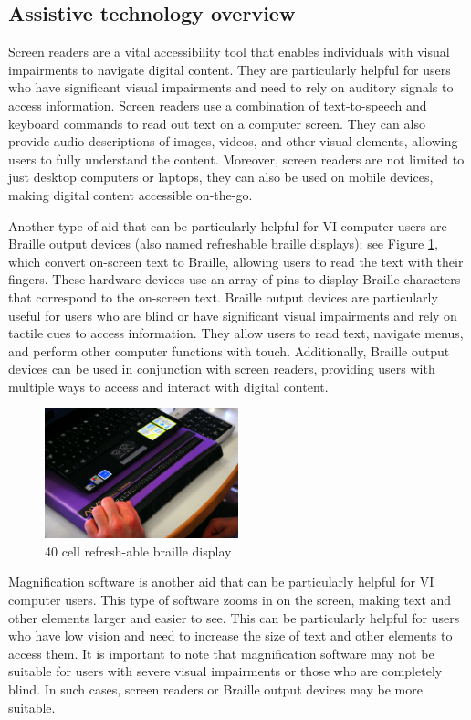 \documentclass{l4proj}
\begin{document}
\subsection{Assistive technology overview}
Screen readers are a vital accessibility tool that enables individuals with visual impairments to navigate digital content. They are particularly helpful for users who have significant visual impairments and need to rely on auditory signals to access information. Screen readers use a combination of text-to-speech and keyboard commands to read out text on a computer screen. They can also provide audio descriptions of images, videos, and other visual elements, allowing users to fully understand the content. Moreover, screen readers are not limited to just desktop computers or laptops, they can also be used on mobile devices, making digital content accessible on-the-go.

Another type of aid that can be particularly helpful for VI computer users are Braille output devices (also named refreshable braille displays); see Figure \ref{fig:braille display}, which convert on-screen text to Braille, allowing users to read the text with their fingers. These hardware devices use an array of pins to display Braille characters that correspond to the on-screen text. Braille output devices are particularly useful for users who are blind or have significant visual impairments and rely on tactile cues to access information. They allow users to read text, navigate menus, and perform other computer functions with touch. Additionally, Braille output devices can be used in conjunction with screen readers, providing users with multiple ways to access and interact with digital content. 

\begin{figure}
    \centering
    \includegraphics[width=0.5\textwidth]{dissertation/images/Plage-braille.jpg}
    \caption{40 cell refresh-able braille display \cite{braille}}
    \label{fig:braille display}
\end{figure}

Magnification software is another aid that can be particularly helpful for VI computer users. This type of software zooms in on the screen, making text and other elements larger and easier to see. This can be particularly helpful for users who have low vision and need to increase the size of text and other elements to access them. It is important to note that magnification software may not be suitable for users with severe visual impairments or those who are completely blind. In such cases, screen readers or Braille output devices may be more suitable. 
\end{document}
